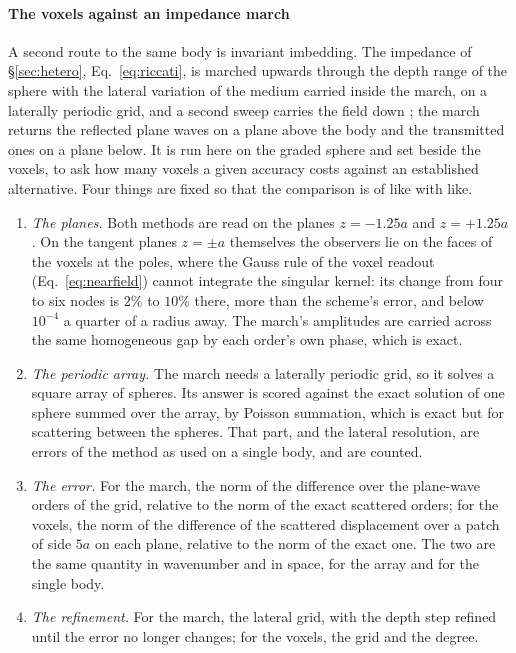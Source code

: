 \documentclass[preprint,review,12pt]{elsarticle}
\begin{document}
\paragraph{The voxels against an impedance march} A second route to the same body is invariant
imbedding. The impedance of \S\ref{sec:hetero}, Eq.~\eqref{eq:riccati}, is marched upwards through the
depth range of the sphere with the lateral variation of the medium carried inside the march, on a
laterally periodic grid, and a second sweep carries the field down \citep{Haines2004}; the march
returns the reflected plane waves on a plane above the body and the transmitted ones on a plane below.
It is run here on the graded sphere and set beside the voxels, to ask how many voxels a given accuracy
costs against an established alternative. Four things are fixed so that the comparison is of like with
like.
\begin{enumerate}
\item \emph{The planes.} Both methods are read on the planes $z=-1.25a$ and $z=+1.25a$. On the tangent
planes $z=\pm a$ themselves the observers lie on the faces of the voxels at the poles, where the Gauss
rule of the voxel readout (Eq.~\eqref{eq:nearfield}) cannot integrate the singular kernel: its change
from four to six nodes is $2\%$ to $10\%$ there, more than the scheme's error, and below $10^{-4}$ a
quarter of a radius away. The march's amplitudes are carried across the same homogeneous gap by each
order's own phase, which is exact.
\item \emph{The periodic array.} The march needs a laterally periodic grid, so it solves a square array
of spheres. Its answer is scored against the exact solution of one sphere summed over the array, by
Poisson summation, which is exact but for scattering between the spheres. That part, and the lateral
resolution, are errors of the method as used on a single body, and are counted.
\item \emph{The error.} For the march, the norm of the difference over the plane-wave orders of the
grid, relative to the norm of the exact scattered orders; for the voxels, the norm of the difference of
the scattered displacement over a patch of side $5a$ on each plane, relative to the norm of the exact
one. The two are the same quantity in wavenumber and in space, for the array and for the single body.
\item \emph{The refinement.} For the march, the lateral grid, with the depth step refined until the
error no longer changes; for the voxels, the grid and the degree.
\end{enumerate}
\end{document}
